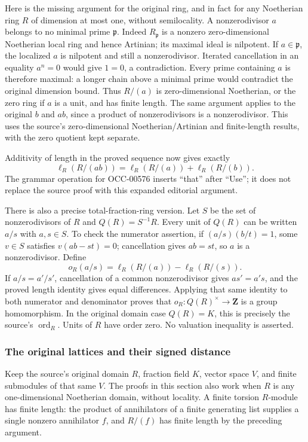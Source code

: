 Here is the missing argument for the original ring, and in fact for any Noetherian ring \(R\) of dimension at most one, without semilocality. A nonzerodivisor \(a\) belongs to no minimal prime \(\mathfrak p\). Indeed \(R_{\mathfrak p}\) is a nonzero zero-dimensional Noetherian local ring and hence Artinian; its maximal ideal is nilpotent. If \(a\in\mathfrak p\), the localized \(a\) is nilpotent and still a nonzerodivisor. Iterated cancellation in an equality \(a^n=0\) would give \(1=0\), a contradiction. Every prime containing \(a\) is therefore maximal: a longer chain above a minimal prime would contradict the original dimension bound. Thus \(R/(a)\) is zero-dimensional Noetherian, or the zero ring if \(a\) is a unit, and has finite length. The same argument applies to the original \(b\) and \(ab\), since a product of nonzerodivisors is a nonzerodivisor. This uses the source's zero-dimensional Noetherian/Artinian and finite-length results, with the zero quotient kept separate.

Additivity of length in the proved sequence now gives exactly \[
 \ell_R(R/(ab))=\ell_R(R/(a))+\ell_R(R/(b)).
\] The grammar operation for OCC-00576 inserts ``that'' after ``Use''; it does not replace the source proof with this expanded editorial argument.

There is also a precise total-fraction-ring version. Let \(S\) be the set of nonzerodivisors of \(R\) and \(Q(R)=S^{-1}R\). Every unit of \(Q(R)\) can be written \(a/s\) with \(a,s\in S\). To check the numerator assertion, if \((a/s)(b/t)=1\), some \(v\in S\) satisfies \(v(ab-st)=0\); cancellation gives \(ab=st\), so \(a\) is a nonzerodivisor. Define \[
 o_R(a/s)=\ell_R(R/(a))-\ell_R(R/(s)).
\] If \(a/s=a'/s'\), cancellation of a common nonzerodivisor gives \(as'=a's\), and the proved length identity gives equal differences. Applying that same identity to both numerator and denominator proves that \(o_R:Q(R)^\times\to\mathbf Z\) is a group homomorphism. In the original domain case \(Q(R)=K\), this is precisely the source's \(\operatorname{ord}_R\). Units of \(R\) have order zero. No valuation inequality is asserted.

\subsubsection{The original lattices and their signed distance}\label{algebra-proof-030-the-original-lattices-and-their-signed-distance}

Keep the source's original domain \(R\), fraction field \(K\), vector space \(V\), and finite submodules of that same \(V\). The proofs in this section also work when \(R\) is any one-dimensional Noetherian domain, without locality. A finite torsion \(R\)-module has finite length: the product of annihilators of a finite generating list supplies a single nonzero annihilator \(f\), and \(R/(f)\) has finite length by the preceding argument.

